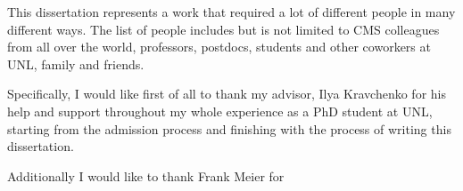  \begin{acknowledgments}

This dissertation represents a work that required a lot of different people in many different ways. The list of people includes but is not limited to CMS colleagues from all over the world, professors, postdocs, students and other coworkers at UNL, family and friends.

Specifically, I would like first of all to thank my advisor, Ilya Kravchenko for his help and support throughout my whole experience as a PhD student at UNL, starting from the admission process and finishing with the process of writing this dissertation. 

Additionally I would like to thank Frank Meier for    
  


 \end{acknowledgments}
